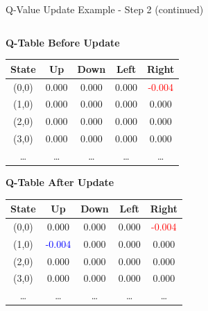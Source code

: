 \documentclass[aspectratio=169]{beamer}
\begin{document}
\begin{frame}{Q-Value Update Example - Step 2 (continued)}
 
    
    \begin{columns}
        \begin{column}{0.5\textwidth}
            \textbf{Q-Table Before Update}
            \small
            \begin{table}[h]
                \centering
                \begin{tabular}{|c|c|c|c|c|}
                    \hline
                    \textbf{State} & \textbf{Up} & \textbf{Down} & \textbf{Left} & \textbf{Right} \\
                    \hline
                    (0,0) & 0.000 & 0.000 & 0.000 & \textcolor{red}{-0.004} \\
                    (1,0) & 0.000 & 0.000 & 0.000 & 0.000 \\
                    (2,0) & 0.000 & 0.000 & 0.000 & 0.000 \\
                    (3,0) & 0.000 & 0.000 & 0.000 & 0.000 \\
                    \dots & \dots & \dots & \dots & \dots \\
                    \hline
                \end{tabular}
            \end{table}
            
            \textbf{Q-Table After Update}
            \small
            \begin{table}[h]
                \centering
                \begin{tabular}{|c|c|c|c|c|}
                    \hline
                    \textbf{State} & \textbf{Up} & \textbf{Down} & \textbf{Left} & \textbf{Right} \\
                    \hline
                    (0,0) & 0.000 & 0.000 & 0.000 & \textcolor{red}{-0.004} \\
                    (1,0) & \textcolor{blue}{-0.004} & 0.000 & 0.000 & 0.000 \\
                    (2,0) & 0.000 & 0.000 & 0.000 & 0.000 \\
                    (3,0) & 0.000 & 0.000 & 0.000 & 0.000 \\
                    \dots & \dots & \dots & \dots & \dots \\
                    \hline
                \end{tabular}
            \end{table}
        \end{column}
        

\end{columns}
\end{frame}
\end{document}
